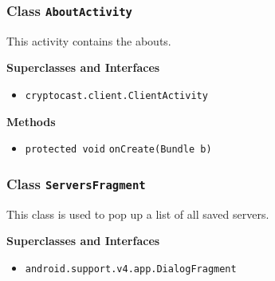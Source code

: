 \subsubsection{Class \lstinline|AboutActivity|}
This activity contains the abouts. \\
\noindent\begin{minipage}[t]{5cm}
\vspace{0.3em}
\hspace*{2em}
\vspace{0.3em}
\end{minipage}



\textbf{\sffamily Superclasses and Interfaces}
\begin{itemize}
\item \lstinline|cryptocast.client.ClientActivity|
\end{itemize}



\textbf{\sffamily Methods}
\begin{itemize}
\item \lstinline|protected void| \lstinline|onCreate|\lstinline|(Bundle b)| \\[-0.6em]




\end{itemize}

\subsubsection{Class \lstinline|ServersFragment|}
This class is used to pop up a list of all saved servers. \\
\noindent\begin{minipage}[t]{5cm}
\vspace{0.3em}
\hspace*{2em}
\vspace{0.3em}
\end{minipage}



\textbf{\sffamily Superclasses and Interfaces}
\begin{itemize}
\item \lstinline|android.support.v4.app.DialogFragment|
\end{itemize}


